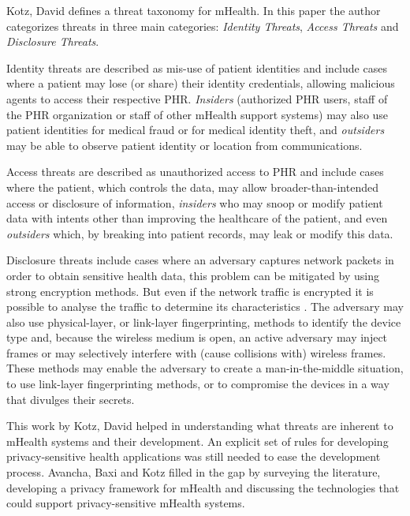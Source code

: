 Kotz, David \cite{kotz2011threat} defines a threat taxonomy for mHealth. In this paper the author categorizes threats in three main categories: \emph{Identity Threats}, \emph{Access Threats} and \emph{Disclosure Threats}.

Identity threats are described as mis-use of patient identities and include cases where a patient may lose (or share) their identity credentials, allowing malicious agents to access their respective \ac{PHR}. \emph{Insiders} (authorized \ac{PHR} users, staff of the \ac{PHR} organization or staff of other mHealth support systems) may also use patient identities for medical fraud or for medical identity theft, and \emph{outsiders} may be able to observe patient identity or location from communications.

Access threats are described as unauthorized access to \ac{PHR} and include cases where the patient, which controls the data, may allow broader-than-intended access or disclosure of information, \emph{insiders} who may snoop or modify patient data with intents other than improving the healthcare of the patient, and even \emph{outsiders} which, by breaking into patient records, may leak or modify this data.

Disclosure threats include cases where an adversary captures network packets in order to obtain sensitive health data, this problem can be mitigated by using strong encryption methods. But even if the network traffic is encrypted it is possible to analyse the traffic to determine its characteristics \cite{wright2006inferring}. The adversary may also use physical-layer, or link-layer fingerprinting, methods to identify the device type and, because the wireless medium is open, an active adversary may inject frames or may selectively interfere with (cause collisions with) wireless frames. These methods may enable the adversary to create a man-in-the-middle situation, to use link-layer fingerprinting methods, or to compromise the devices in a way that divulges their secrets.

This work by Kotz, David \cite{kotz2011threat} helped in understanding what threats are inherent to mHealth systems and their development. An explicit set of rules for developing privacy-sensitive health applications was still needed to ease the development process. Avancha, Baxi and Kotz \cite{avancha2012privacy} filled in the gap by surveying the literature, developing a privacy framework for mHealth and discussing the technologies that could support privacy-sensitive mHealth systems.

